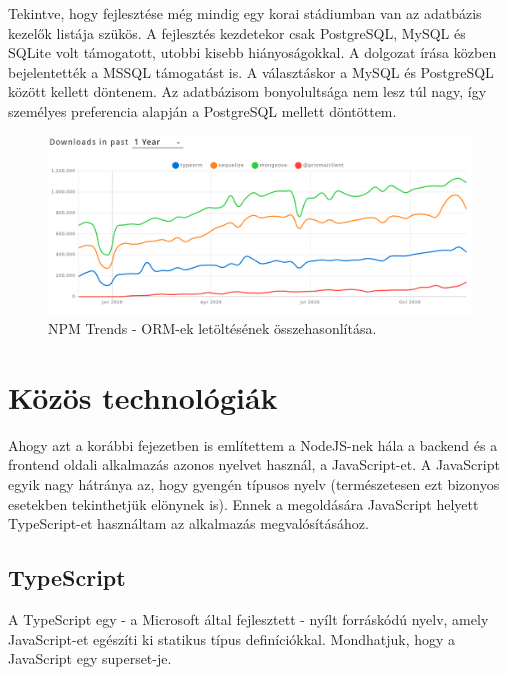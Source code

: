 Tekintve, hogy fejlesztése még mindig egy korai stádiumban van az adatbázis kezelők listája szükös.
A fejlesztés kezdetekor csak PostgreSQL, MySQL és SQLite volt támogatott, utobbi kisebb hiányoságokkal.
A dolgozat írása közben bejelentették a MSSQL támogatást is. 
A választáskor a MySQL és PostgreSQL között kellett döntenem.
Az adatbázisom bonyolultsága nem lesz túl nagy, így személyes preferencia alapján a PostgreSQL mellett döntöttem.

\begin{figure}[!ht]
  \centering
  \includegraphics[width=150mm, keepaspectratio]{figures/orm_npm_trends.png}
  \caption{NPM Trends - ORM-ek letöltésének összehasonlítása.}
  \label{fig:ORMTrends}
\end{figure}

\section{Közös technológiák}
Ahogy azt a korábbi fejezetben is említettem a NodeJS-nek hála a backend és a frontend oldali alkalmazás azonos nyelvet használ, a JavaScript-et.
A JavaScript egyik nagy hátránya az, hogy gyengén típusos nyelv (természetesen ezt bizonyos esetekben tekinthetjük elönynek is). Ennek a megoldására JavaScript helyett TypeScript-et használtam az alkalmazás megvalósításához.

\subsection{TypeScript}

A TypeScript egy - a Microsoft által fejlesztett - nyílt forráskódú nyelv, amely JavaScript-et egészíti ki statikus típus definíciókkal. Mondhatjuk, hogy a JavaScript egy superset-je.

